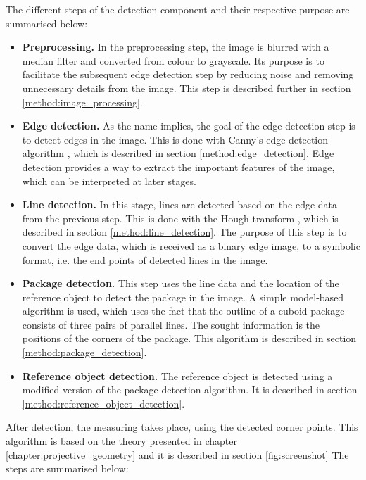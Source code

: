 The different steps of the detection component and their respective purpose are summarised below:
\begin{itemize}
	\item \textbf{Preprocessing.} In the preprocessing step, the image is blurred with a median filter and converted from colour to grayscale. Its purpose is to facilitate the subsequent edge detection step by reducing noise and removing unnecessary details from the image. This step is described further in section \ref{method:image_processing}.
	\item \textbf{Edge detection.} As the name implies, the goal of the edge detection step is to detect edges in the image. This is done with Canny's edge detection algorithm \cite{canny}, which is described in section \ref{method:edge_detection}.  Edge detection provides a way to extract the important features of the image, which can be interpreted at later stages.
	\item \textbf{Line detection.} In this stage, lines are detected based on the edge data from the previous step. This is done with the Hough transform \cite{illingworth1988survey}, which is described in section \ref{method:line_detection}. The purpose of this step is to convert the edge data, which is received as a binary edge image, to a symbolic format, i.e. the end points of detected lines in the image. 
	\item \textbf{Package detection.} This step uses the line data and the location of the reference object to detect the package in the image. A simple model-based algorithm is used, which uses the fact that the outline of a cuboid package consists of three pairs of parallel lines. The sought information is the positions of the corners of the package. This algorithm is described in section \ref{method:package_detection}.
 	\item \textbf{Reference object detection.} The reference object is detected using a modified version of the package detection algorithm. It is described in section \ref{method:reference_object_detection}.
\end{itemize}
After detection, the measuring takes place, using the detected corner points. This algorithm is based on the theory presented in chapter \ref{chapter:projective_geometry} and it is described in section \ref{fig:screenshot} The steps are summarised below:
